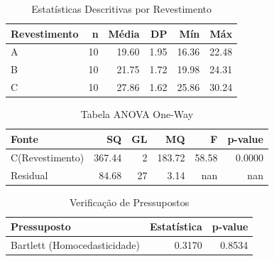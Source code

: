 \begin{table}[h!]
\centering
\caption{Estatísticas Descritivas por Revestimento}
\label{tab:descritivas_oneway}
\begin{tabular}{|l|r|r|r|r|r|}
\hline
\textbf{Revestimento} & \textbf{n} & \textbf{Média} & \textbf{DP} & \textbf{Mín} & \textbf{Máx} \\
\hline
A & 10 & 19.60 & 1.95 & 16.36 & 22.48 \\
B & 10 & 21.75 & 1.72 & 19.98 & 24.31 \\
C & 10 & 27.86 & 1.62 & 25.86 & 30.24 \\
\hline
\end{tabular}
\end{table}

\begin{table}[h!]
\centering
\caption{Tabela ANOVA One-Way}
\label{tab:anova_oneway}
\begin{tabular}{|l|r|r|r|r|r|}
\hline
\textbf{Fonte} & \textbf{SQ} & \textbf{GL} & \textbf{MQ} & \textbf{F} & \textbf{p-value} \\
\hline
C(Revestimento) & 367.44 & 2 & 183.72 & 58.58 & 0.0000 \\
Residual & 84.68 & 27 & 3.14 & nan & nan \\
\hline
\end{tabular}
\end{table}

\begin{table}[h!]
\centering
\caption{Verificação de Pressupostos}
\label{tab:pressupostos_oneway}
\begin{tabular}{|l|r|r|}
\hline
\textbf{Pressuposto} & \textbf{Estatística} & \textbf{p-value} \\
\hline
Bartlett (Homocedasticidade) & 0.3170 & 0.8534 \\
\hline
\end{tabular}
\end{table}
